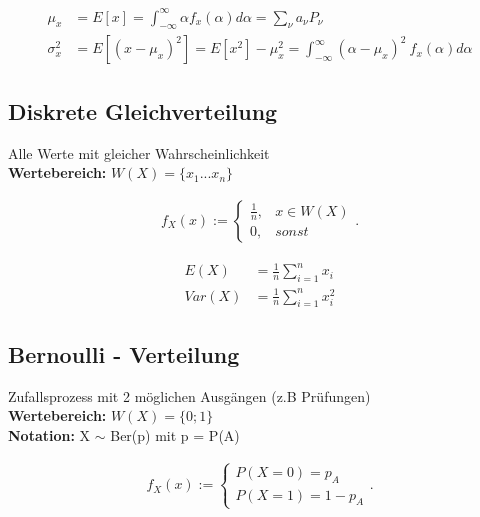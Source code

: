 \documentclass[10pt,a4paper]{article}
\begin{document}
  \begin{mdframed}[style=exercise]
    \begin{align}
        \mu_x &= E[x] = \displaystyle\int_{-\infty}^{\infty} \alpha f_x(\alpha) d\alpha = \displaystyle\sum_{\nu}^{} a_\nu P_\nu\\
        \sigma_x^2 &= E[(x-\mu_x)^2] = E[x^2]-\mu_x^2  = \displaystyle\int_{-\infty}^{\infty} (\alpha-\mu_x)^2 \ f_x(\alpha) d\alpha
    \end{align}
  \end{mdframed}
  
\subsection{Diskrete Gleichverteilung}
Alle Werte mit gleicher Wahrscheinlichkeit \\
\textbf{Wertebereich:} $W(X)= \{x_1 ... x_n \}$
  \begin{mdframed}[style=exercise]
    \begin{align}
        f_X(x):=\left\{\begin{array}{ll} \frac{1}{n},  & x \in W(X) \\
         0, & sonst\end{array}\right. .
    \end{align}
  \end{mdframed}

  \begin{mdframed}[style=exercise]
    \begin{align}
        E(X) &= \frac{1}{n} \sum_{i=1}^n x_i \\
        Var(X) &= \frac{1}{n} \sum_{i=1}^n x_i^2 
    \end{align}
  \end{mdframed}

\subsection{Bernoulli - Verteilung}
Zufallsprozess mit 2 möglichen Ausgängen (z.B Prüfungen) \\
\textbf{Wertebereich:} $W(X)= \{0;1 \}$\\
\textbf{Notation:} X $\sim$ Ber(p) mit p = P(A) 
  \begin{mdframed}[style=exercise]
    \begin{align}
        f_X(x):=\left\{\begin{array}{ll} P(X=0) = p_A \\
         P(X=1) = 1-p_A \end{array}\right. .
    \end{align}
  \end{mdframed}
\end{document}
